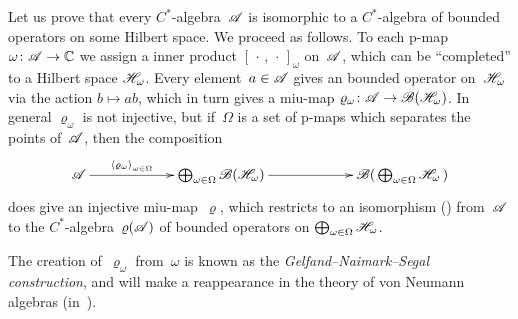 \documentclass[a]{subfiles}
\begin{document}
\begin{parsec}%
    \begin{point}%
Let us prove that every $C^*$-algebra~$\mathscr{A}$
is isomorphic
to a $C^*$-algebra
of bounded operators on some Hilbert space.
We proceed as follows.
To each p-map $\omega\colon \mathscr{A}\to\mathbb{C}$
we assign a inner product $[\,\cdot\,,\,\cdot\,]_\omega$ on~$\mathscr{A}$,
which can be ``completed'' to a Hilbert space $\mathscr{H}_\omega$.
Every element~$a\in \mathscr{A}$ gives an bounded operator on~$\mathscr{H}_\omega$
via the action $b\mapsto ab$, which in turn gives a 
miu-map $\varrho_\omega\colon \mathscr{A}\to \mathscr{B} (\mathscr{H}_\omega)$.
In general $\varrho_\omega$ is not injective,
but if~$\Omega$ is a set of p-maps which separates the
points of~$\mathscr{A}$,
then the composition
\begin{equation*}
	\xymatrix@C=6em{
		\scrA\ar[r]^-{\left<\varrho_\omega\right>_{\omega\in \Omega}}
		&
		\bigoplus_{\omega\in\Omega} \scrB(\scrH_\omega)
		\ar[r]
		&
		\scrB(\,\bigoplus_{\omega\in\Omega}\scrH_\omega\,)
	}
\end{equation*}
does give an injective miu-map~$\varrho$,
which restricts to an isomorphism 
()
from~$\mathscr{A}$
to the $C^*$-algebra~$\varrho(\mathscr{A})$
of bounded operators
on $\bigoplus_{\omega\in \Omega} \mathscr{H}_\omega$.

The creation of~$\varrho_\omega$ from~$\omega$
is known as the \emph{Gelfand--Naimark--Segal construction},
and will make a reappearance in the theory of von Neumann algebras
(in~).


\end{point}
\end{parsec}
\end{document}
